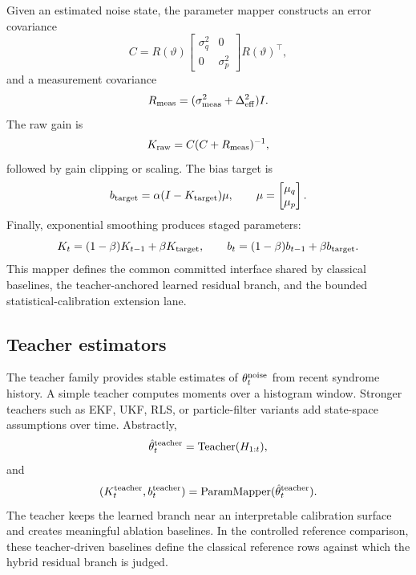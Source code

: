 \documentclass[11pt]{article}
\begin{document}
Given an estimated noise state, the parameter mapper constructs an error
covariance
\begin{equation}
    C =
    R(\vartheta)
    \begin{bmatrix}
        \sigma_q^2 & 0\\
        0 & \sigma_p^2
    \end{bmatrix}
    R(\vartheta)^\top ,
\end{equation}
and a measurement covariance
\begin{equation}
    R_{\rm meas}=(\sigma_{\rm meas}^2+\Delta_{\rm eff}^2)I.
\end{equation}
The raw gain is
\begin{equation}
    K_{\rm raw}=C(C+R_{\rm meas})^{-1},
\end{equation}
followed by gain clipping or scaling.  The bias target is
\begin{equation}
    b_{\rm target}=\alpha(I-K_{\rm target})\mu,
    \qquad
    \mu=\begin{bmatrix}\mu_q\\\mu_p\end{bmatrix}.
\end{equation}
Finally, exponential smoothing produces staged parameters:
\begin{equation}
    K_t=(1-\beta)K_{t-1}+\beta K_{\rm target},
    \qquad
    b_t=(1-\beta)b_{t-1}+\beta b_{\rm target}.
\end{equation}
This mapper defines the common committed interface shared by classical
baselines, the teacher-anchored learned residual branch, and the bounded
statistical-calibration extension lane.

\subsection{Teacher estimators}

The teacher family provides stable estimates of \(\theta_t^{\rm noise}\) from
recent syndrome history.  A simple teacher computes moments over a histogram
window.  Stronger teachers such as EKF, UKF, RLS, or particle-filter variants
add state-space assumptions over time.  Abstractly,
\begin{equation}
    \hat{\theta}_t^{\rm teacher}={\rm Teacher}(H_{1:t}),
\end{equation}
and
\begin{equation}
    (K_t^{\rm teacher},b_t^{\rm teacher})
    =
    {\rm ParamMapper}(\hat{\theta}_t^{\rm teacher}).
\end{equation}
The teacher keeps the learned branch near an interpretable calibration surface
and creates meaningful ablation baselines.  In the controlled reference comparison,
these teacher-driven baselines define the classical reference rows against
which the hybrid residual branch is judged.
\end{document}

